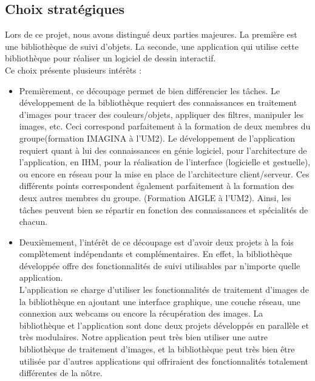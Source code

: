 \documentclass{report}
\begin{document}
			\subsection{Choix stratégiques}
			Lors de ce projet, nous avons distingué deux parties majeures.
			La première est une bibliothèque de suivi d'objets. La seconde, une application qui utilise cette bibliothèque pour réaliser un logiciel de dessin interactif. \\
			Ce choix présente plusieurs intérêts : \\
			\begin{itemize}
				\item{Premièrement, ce découpage permet de bien différencier les tâches. Le développement de la bibliothèque requiert des connaissances en traitement d'images pour tracer des couleurs/objets, appliquer des filtres, manipuler les images, etc. Ceci correspond parfaitement à la formation de deux membres du groupe(formation IMAGINA à l'UM2). 
				Le développement de l'application requiert quant à lui des connaissances en génie logiciel, pour l'architecture de l'application, en IHM, pour la réalisation de l'interface (logicielle et gestuelle), ou encore en réseau pour la mise en place de l'architecture client/serveur. 
				Ces différents points correspondent également parfaitement à la formation des deux autres membres du groupe. (Formation AIGLE à l'UM2). Ainsi, les tâches peuvent bien se répartir en fonction des connaissances et spécialités de chacun.} \\
				\item{Deuxièmement, l'intérêt de ce découpage est d'avoir deux projets à la fois complètement indépendants et complémentaires. En effet, la bibliothèque développée offre des fonctionnalités de suivi utilisables par n'importe quelle application.\\
				L'application se charge d'utiliser les fonctionnalités de traitement d'images de la bibliothèque en ajoutant une interface graphique, une couche réseau, une connexion aux webcams ou encore la récupération des images.
				La bibliothèque et l'application sont donc deux projets développés en parallèle et très modulaires. Notre application peut très bien utiliser une autre bibliothèque de traitement d'images, et la bibliothèque peut très bien être utilisée par d'autres applications qui offriraient des fonctionnalités totalement différentes de la nôtre.}
			\end{itemize}
			\newpage
\end{document}
